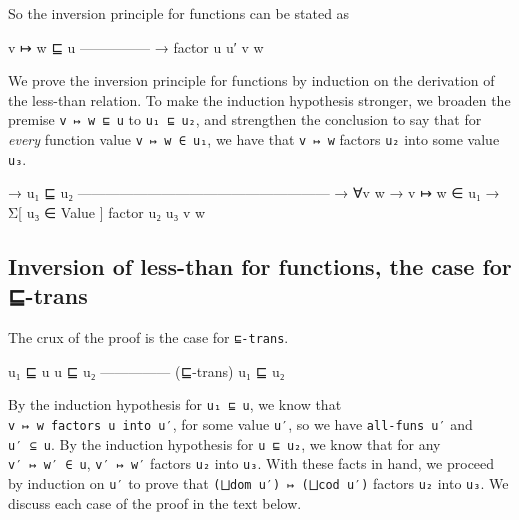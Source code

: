 So the inversion principle for functions can be stated as

\begin{myDisplay}
  v ↦ w ⊑ u
  ---------------
→ factor u u′ v w
\end{myDisplay}

We prove the inversion principle for functions by induction on the
derivation of the less-than relation. To make the induction hypothesis
stronger, we broaden the premise \texttt{v\ ↦\ w\ ⊑\ u} to
\texttt{u₁\ ⊑\ u₂}, and strengthen the conclusion to say that for
\emph{every} function value \texttt{v\ ↦\ w\ ∈\ u₁}, we have that
\texttt{v\ ↦\ w} factors \texttt{u₂} into some value \texttt{u₃}.

\begin{myDisplay}
→ u₁ ⊑ u₂
  ------------------------------------------------------
→ ∀{v w} → v ↦ w ∈ u₁ → Σ[ u₃ ∈ Value ] factor u₂ u₃ v w
\end{myDisplay}

\hypertarget{inversion-of-less-than-for-functions-the-case-for--trans}{%
\subsection{Inversion of less-than for functions, the case for
⊑-trans}\label{inversion-of-less-than-for-functions-the-case-for--trans}}

The crux of the proof is the case for \texttt{⊑-trans}.

\begin{myDisplay}
u₁ ⊑ u   u ⊑ u₂
--------------- (⊑-trans)
    u₁ ⊑ u₂
\end{myDisplay}

By the induction hypothesis for \texttt{u₁\ ⊑\ u}, we know that
\texttt{v\ ↦\ w\ factors\ u\ into\ u′}, for some value \texttt{u′}, so
we have \texttt{all-funs\ u′} and \texttt{u′\ ⊆\ u}. By the induction
hypothesis for \texttt{u\ ⊑\ u₂}, we know that for any
\texttt{v′\ ↦\ w′\ ∈\ u}, \texttt{v′\ ↦\ w′} factors \texttt{u₂} into
\texttt{u₃}. With these facts in hand, we proceed by induction on
\texttt{u′} to prove that \texttt{(⨆dom\ u′)\ ↦\ (⨆cod\ u′)} factors
\texttt{u₂} into \texttt{u₃}. We discuss each case of the proof in the
text below.

